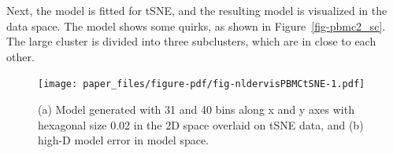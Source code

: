 \documentclass[
  12pt]{article}
\begin{document}
Next, the model is fitted for tSNE, and the resulting model is
visualized in the data space. The model shows some quirks, as shown in
Figure~\ref{fig-pbmc2_sc}. The large cluster is divided into three
subclusters, which are in close to each other.

\begin{figure}[H]

{\centering \texttt{[image: paper\_files/figure-pdf/fig-nldervisPBMCtSNE-1.pdf]}

}

\caption{\label{fig-nldervisPBMCtSNE}(a) Model generated with 31 and 40
bins along x and y axes with hexagonal size 0.02 in the 2D space
overlaid on tSNE data, and (b) high-D model error in model space.}

\end{figure}
\end{document}
